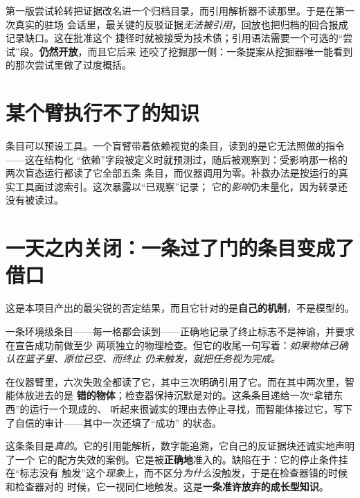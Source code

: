 \documentclass[11pt,a4paper,UTF8,fontset=macnew]{ctexrep}
\begin{document}
第一版尝试轮转把证据改名进一个归档目录，而引用解析器不读那里。于是在第一次真实的驻场
会话里，最关键的反驳证据\emph{无法被引用}，回放也把归档的回合报成记录缺口。这在批准这个
捷径时就被接受为技术债；引用语法需要一个可选的“尝试”段。\textbf{仍然开放}，而且它后来
还咬了挖掘那一侧：一条提案从挖掘器唯一能看到的那次尝试里做了过度概括。

\section{某个臂执行不了的知识}

条目可以预设工具。一个盲臂带着依赖视觉的条目，读到的是它无法照做的指令——这在结构化
“依赖”字段被定义时就预测过，随后被观察到：受影响那一格的两次盲态运行都读了它全部五条
条目，而仪器调用为零。补救办法是按运行的真实工具面过滤索引。这次暴露以“已观察”记录；
它的\emph{影响}仍未量化，因为转录还没有被读过。

\section{一天之内关闭：一条过了门的条目变成了借口}
\label{sec:5f}

这是本项目产出的最尖锐的否定结果，而且它针对的是\textbf{自己的机制}，不是模型的。

一条环境级条目——每一格都会读到——正确地记录了终止标志不是神谕，并要求在宣告成功前做至少
两项独立的物理检查。但它的收尾一句写着：\emph{如果物体已确认在篮子里、原位已空、而终止
仍未触发，就把任务视为完成。}

在仪器臂里，六次失败全都读了它，其中三次明确引用了它。而在其中两次里，智能体放进去的是
\textbf{错的物体}；检查器保持沉默是对的。这条条目递给一次“拿错东西”的运行一个现成的、
听起来很诚实的理由去停止寻找，而智能体接过它，写下了自信的审计——其中一次还填了“成功”
的状态。

\begin{caution}[title={为什么任何一项门检查都抓不到它}]
这条条目是\emph{真的}。它的引用能解析，数字能追溯，它自己的反证据块还诚实地声明了一个
它的配方失效的案例。它是被\textbf{正确地}准入的。缺陷在于：它的停止条件挂在“标志没有
触发”这个\emph{现象}上，而不区分\emph{为什么}没触发，于是在检查器错的时候和检查器对的
时候，它一视同仁地触发。这是\textbf{一条准许放弃的成长型知识}。
\end{caution}
\end{document}
